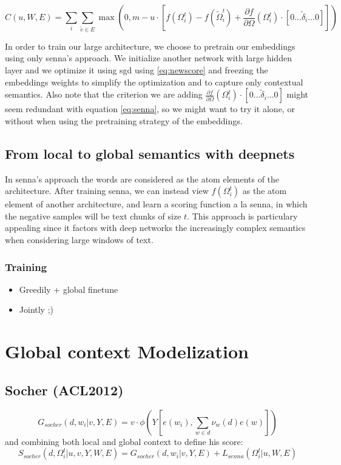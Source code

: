 \documentclass[11pt]{article} %
\begin{document}
\begin{equation}
\label{eq:newscore}
\displaystyle C(u,W,E) = \sum_i \sum_{\tilde e \in E} \max \left(0,m - u \cdot \left[ f\left(\Omega_i^t\right)   
- f\left(\tilde{\Omega}_i^t\right) + \frac{\partial f }{\partial  \Omega} \left(\Omega_i^t\right) \cdot \left[ 0\ldots\tilde{\delta}_{i} \ldots 0\right]  \right] \right) 
\end{equation}

In order to train our large architecture, we choose to pretrain our
embeddings using only senna's approach. We initialize another network
with large hidden layer and we optimize it using sgd using
\ref{eq:newscore} and freezing the embeddings weights to simplify the
optimization and to capture only contextual semantics. Also note that
the criterion we are adding $\frac{\partial f }{\partial \Omega}
\left(\Omega_i^t\right) \cdot \left[ 0\ldots\tilde{\delta}_{i} \ldots
  0\right] $ might seem redundant with equation \ref{eq:senna}, so we
might want to try it alone, or without when using the pretraining
strategy of the embeddings.

\subsection{From local to global  semantics with deepnets}

In senna's approach the words are considered as the atom elements of
the architecture. After training senna, we can instead view
$f(\Omega_i^t)$ as the atom element of another architecture, and learn
a scoring function a la senna, in which the negative samples will be
text chunks of size $t$.  This approach is particulary appealing since
it factors with deep networks the increasingly complex semantics when
considering large windows of text.

\subsubsection{Training}
\begin{itemize}
\item Greedily + global finetune
\item Jointly ;)
\end{itemize}

\section{Global context Modelization}

\subsection{Socher (ACL2012)}
\[G_{socher}(d,w_i| v,Y,E) = v \cdot \phi\left(Y\left[e(w_i),\sum_{w\in d} \nu_w (d) e(w) \right] \right) \]
and combining both local and global context to define his score:
\[ S_{socher}(d, \Omega_{i}^t | u,v,Y,W,E) = G_{socher}(d,w_{i}| v,Y,E)  + L_{senna} \left(\Omega_{i}^t  | u,W,E\right) \]
\end{document}
